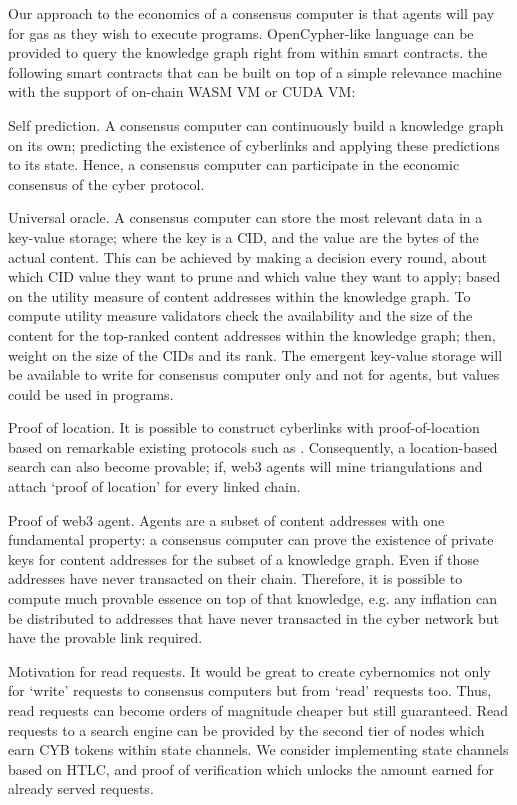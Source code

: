 \documentclass[8pt,oneside]{amsart}
\newcommand{\linkgreen}[2]{\href{#1}{\color{green}{#2}}}
\newcommand{\code}[1]{{\PlayBold #1}}
\begin{document}
\begin{Abstract}
Our approach to the economics of a consensus computer is that agents will pay for gas as they wish to execute programs. OpenCypher-like language can be provided to query the knowledge graph right from within smart contracts. \linkgreen{https://medium.com/@karpathy/software-2-0-a64152b37c35}{We can envision} the following smart contracts that can be built on top of a simple relevance machine with the support of on-chain WASM VM or CUDA VM:

\code{Self prediction}. A consensus computer can continuously build a knowledge graph on its own; predicting the existence of cyberlinks and applying these predictions to its state. Hence, a consensus computer can participate in the economic consensus of the cyber protocol.

\code{Universal oracle}. A consensus computer can store the most relevant data in a key-value storage; where the key is a CID, and the value are the bytes of the actual content. This can be achieved by making a decision every round, about which CID value they want to prune and which value they want to apply; based on the utility measure of content addresses within the knowledge graph. To compute utility measure validators check the availability and the size of the content for the top-ranked content addresses within the knowledge graph; then, weight on the size of the CIDs and its rank. The emergent key-value storage will be available to write for consensus computer only and not for agents, but values could be used in programs.

\code{Proof of location}. It is possible to construct cyberlinks with proof-of-location based on remarkable existing protocols such as \linkgreen{https://ipfs.io/ipfs/QmZYKGuLHf2h1mZrhiP2FzYsjj3tWt2LYduMCRbpgi5pKG}{Foam}. Consequently, a location-based search can also become provable; if, web3 agents will mine triangulations and attach ‘proof of location’ for every linked chain.

\code{Proof of web3 agent}. Agents are a subset of content addresses with one fundamental property: a consensus computer can prove the existence of private keys for content addresses for the subset of a knowledge graph. Even if those addresses have never transacted on their chain. Therefore, it is possible to compute much provable essence on top of that knowledge, e.g. any inflation can be distributed to addresses that have never transacted in the cyber network but have the provable link required.

\code{Motivation for read requests}. It would be great to create cybernomics not only for ‘write’ requests to consensus computers but from ‘read’ requests too. Thus, read requests can become orders of magnitude cheaper but still guaranteed. Read requests to a search engine can be provided by the second tier of nodes which earn CYB tokens within state channels. We consider implementing state channels based on HTLC, and proof of verification which unlocks the amount earned for already served requests.


\end{Abstract}
\end{document}
